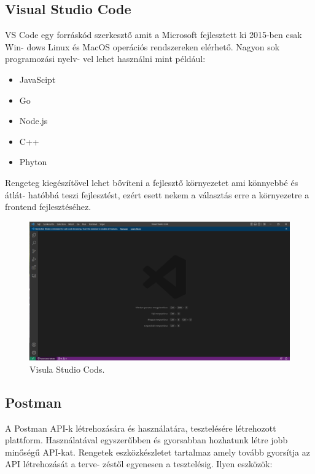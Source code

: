 \subsection{Visual Studio Code}

VS Code egy forráskód szerkesztő amit a Microsoft fejlesztett ki 2015-ben csak Win-
dows Linux és MacOS operációs rendszereken elérhető. Nagyon sok programozási nyelv-
vel lehet használni mint például:

\begin{itemize}
\item JavaScipt
\item Go
\item Node.js
\item C++
\item Phyton
\end{itemize}

Rengeteg kiegészítővel lehet bővíteni a fejlesztő környezetet ami könnyebbé és átlát-
hatóbbá teszi  fejlesztést, ezért esett nekem a választás erre a környezetre a frontend fejlesztéséhez.\cite{VSCode}

\begin{figure}[h]
\centering
\includegraphics[scale=0.6]{images/VSCode.png}
\caption{Visula Studio Cods.}
\label{fig:VSCode}
\end{figure}
\newpage

\subsection{Postman}

A Postman\cite{Postman} API-k létrehozására és használatára, tesztelésére létrehozott plattform. Használatával egyszerűbben és gyorsabban hozhatunk létre jobb minőségű API-kat. Rengetek eszközkészletet tartalmaz amely tovább gyorsítja az API létrehozását a  terve-
zéstől egyenesen a tesztelésig. Ilyen eszközök:

